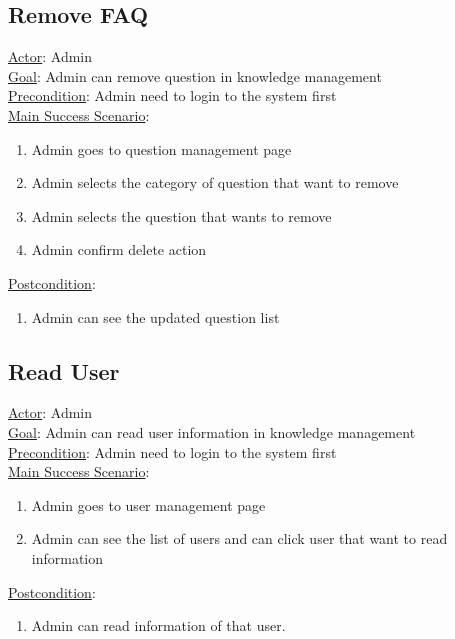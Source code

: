 \documentclass[12pt,oneside,openright,a4paper]{cpe-english-project}
\begin{document}
\subsection{Remove FAQ}
\underline{Actor}: Admin\\
\underline{Goal}: Admin can remove question in knowledge management\\
\underline{Precondition}: Admin need to login to the system first\\
\underline{Main Success Scenario}:
\begin{enumerate}[label={\arabic*.}]
	\item Admin goes to question management page
	\item Admin selects the category of question that want to remove
	\item Admin selects the question that wants to remove
	\item Admin confirm delete action
\end{enumerate}
\underline{Postcondition}: 
\begin{enumerate}[label={\arabic*.}]
	\item Admin can see the updated question list
\end{enumerate}

\subsection{Read User}
\underline{Actor}: Admin\\
\underline{Goal}: Admin can read user information in knowledge management\\
\underline{Precondition}: Admin need to login to the system first\\
\underline{Main Success Scenario}:
\begin{enumerate}[label={\arabic*.}]
	\item Admin goes to user management page
	\item Admin can see the list of users and can click user that want to read information
\end{enumerate}
\underline{Postcondition}: 
\begin{enumerate}[label={\arabic*.}]
	\item Admin can read information of that user.
\end{enumerate}
\end{document}

